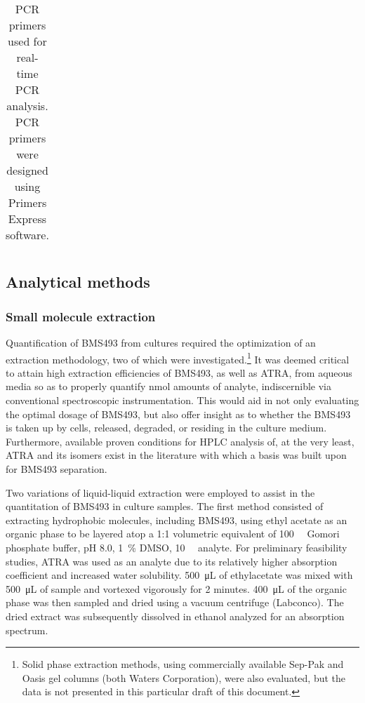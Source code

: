 \begin{refsection}
\begin{table}[h!]
\begin{tabular}{ ll }
  \hline
\end{tabular}
\caption{PCR primers used for real-time PCR analysis. PCR primers were designed
using Primers Express software.}
\label{tab:pcr_primers}
\end{table}

\subsection{Analytical methods}

\subsubsection{Small molecule extraction}


Quantification of BMS493 from cultures required the optimization of an
extraction methodology, two of which were investigated.\footnote{Solid phase
    extraction methods, using commercially available Sep-Pak  and Oasis
    gel columns (both Waters Corporation), were also evaluated, but the data is
not presented in this particular draft of this document.} It was deemed critical
to attain high extraction efficiencies of BMS493, as well as ATRA, from aqueous
media so as to properly quantify \si{\nano\mol} amounts of analyte,
indiscernible via conventional spectroscopic instrumentation. This would aid in
not only evaluating the optimal dosage of BMS493, but also offer insight as to
whether the BMS493 is taken up by cells, released, degraded, or residing in the
culture medium. Furthermore, available proven conditions for HPLC analysis of, at
the very least, ATRA and its isomers exist in the literature with which a basis
was built upon for BMS493
separation.\cite{Kim2010b,Chauveau-Duriot2010,Schaffer2010,Kane2008b,DeLeenheer1982,Motto1989} 

Two variations of liquid-liquid extraction were employed to assist in the
quantitation of BMS493 in culture samples. The first method consisted of
extracting hydrophobic molecules, including BMS493, using ethyl acetate as an
organic phase to be layered atop a 1:1 volumetric equivalent of
\SI{100}{\milli\moLar} Gomori phosphate buffer, pH 8.0, \SI{1}{\percent} DMSO,
\SI{10}{\micro\moLar} analyte. For preliminary feasibility studies, ATRA was
used as an analyte due to its relatively higher absorption coefficient and
increased water solubility. \SI{500}{\uL} of ethylacetate was mixed with
\SI{500}{\uL} of sample and vortexed vigorously for 2 minutes. \SI{400}{\uL} of
the organic phase was then sampled and dried using a vacuum centrifuge
(Labconco). The dried extract was subsequently dissolved in ethanol analyzed
for an absorption spectrum.


\end{refsection}
